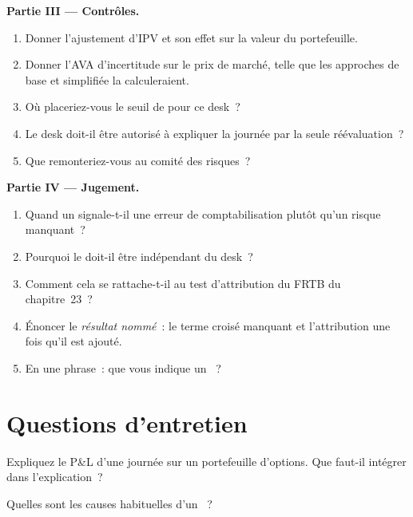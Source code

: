 \begin{problem}
\medskip\noindent\textbf{Partie III --- Contrôles.}
\begin{enumerate}[resume]
\item Donner l'ajustement d'IPV et son effet sur la valeur du portefeuille.
\item Donner l'AVA d'incertitude sur le prix de marché, telle que les approches de base et simplifiée la calculeraient.
\item Où placeriez-vous le seuil de  pour ce desk~?
\item Le desk doit-il être autorisé à expliquer la journée par la seule réévaluation~?
\item Que remonteriez-vous au comité des risques~?
\end{enumerate}

\medskip\noindent\textbf{Partie IV --- Jugement.}
\begin{enumerate}[resume]
\item Quand un  signale-t-il une erreur de comptabilisation plutôt qu'un risque manquant~?
\item Pourquoi le  doit-il être indépendant du desk~?
\item Comment cela se rattache-t-il au test d'attribution du FRTB du chapitre~23~?
\item Énoncer le \emph{résultat nommé}~: le terme croisé manquant et l'attribution une fois qu'il est ajouté.
\item En une phrase~: que vous indique un ~?
\end{enumerate}
\end{problem}

\section{Questions d'entretien}

\begin{interviewq}\label{iq:rc:pnl-explain-and-independent-price-verification:1}
Expliquez le P\&L d'une journée sur un portefeuille d'options. Que faut-il intégrer dans l'explication~?
\end{interviewq}

\begin{interviewq}\label{iq:rc:pnl-explain-and-independent-price-verification:2}
Quelles sont les causes habituelles d'un ~?
\end{interviewq}

